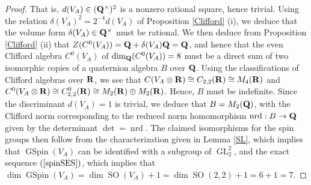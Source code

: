 \documentclass{amsart}
\theoremstyle{definition}
\theoremstyle{definition}
\theoremstyle{definition}
\begin{document}
\begin{proof}
That is, $d(V_A) \in ({\bf{Q}}^{\times})^2$ is a nonzero rational square, hence trivial.
Using the relation $\delta(V_A)^2 = 2^{-4} d(V_A)$ of Proposition \ref{Clifford} (i), 
we deduce that the volume form $\delta(V_A) \in {\bf{Q}}^{\times}$ must be rational. 
We then deduce from Proposition \ref{Clifford} (ii) that $Z(C^0(V_A)) = {\bf{Q}} + \delta(V_A) {\bf{Q}} = {\bf{Q}}$, 
and hence that the even Clifford algebra $C^0(V_A)$ of $\dim_{\bf{Q}}(C^0(V_A)) = 8$
must be a direct sum of two isomorphic copies of a quaternion algebra $B$ over ${\bf{Q}}$. 
Using the classifications of Clifford algebras over ${\bf{R}}$, we see that $C(V_A \otimes {\bf{R}}) \cong C_{2,2}({\bf{R}}) \cong M_4({\bf{R}})$
and $C^0(V_A \otimes {\bf{R}}) \cong C_{2,2}^0({\bf{R}}) \cong M_2({\bf{R}}) \oplus M_2({\bf{R}})$. 
Hence, $B$ must be indefinite. Since the discriminant $d(V_A) =1$ is trivial, 
we deduce that $B=M_2({\bf{Q}})$, with the Clifford norm corresponding to the reduced norm
homomorphism $\operatorname{nrd}: B \rightarrow {\bf{Q}}$ given by the determinant $\det = \operatorname{nrd}$. 
The claimed isomorphisms for the spin groups then follow from the characterization given in Lemma \ref{SL},
which implies that $\operatorname{GSpin}(V_A)$ can be identified with a subgroup of $\operatorname{GL}_2^2$,
and the exact sequence $(\ref{spinSES})$, which implies that $\dim \operatorname{GSpin}(V_A) = \dim \operatorname{SO}(V_A) + 1 =
\dim \operatorname{SO}(2,2) + 1 = 6+1 = 7$. \end{proof}
\end{document}
